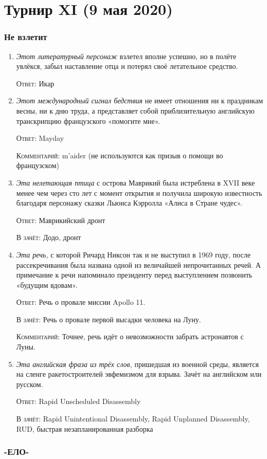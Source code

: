 \documentclass[a4paper,10pt]{article}
\let\keyword\textsc
\newenvironment{topic}{\begin{enumerate}}{\end{enumerate}}
\newcommand{\question}[3]{\item[#1.] #2 \par \keyword{Ответ:} #3}
\newcommand{\alternative}[1]{\par \keyword{В зачёт:} #1}
\newcommand{\commentary}[1]{\par \keyword{Комментарий:} #1}
\begin{document}
\newpage
\part{Турнир XI (9 мая 2020)}

\section{Не взлетит}

\begin{topic}
 \question{10}{\emph{Этот литературный персонаж} взлетел вполне успешно, но в полёте увлёкся, забыл наставление отца и потерял своё летательное средство.}{Икар}
 \question{20}{\emph{Этот международный сигнал бедствия} не имеет отношения ни к праздникам весны, ни к дню труда, а представляет собой приблизительную английскую транскрипцию французского  «помогите мне».}{Mayday}\commentary{m'aider (не используются как призыв о помощи во французском)}
 \question{30}{\emph{Эта нелетающая птица} с острова Маврикий была истреблена в XVII веке менее чем через сто лет с момент открытия и получила широкую известность благодаря персонажу сказки Льюиса Кэрролла «Алиса в Стране чудес».}{Маврикийский дронт}\alternative{Додо, дронт}
 \question{40}{\emph{Эта речь,} с которой Ричард Никсон так и не выступил в 1969 году, после рассекречивания была названа одной из величайшей непрочитанных речей. А примечание к речи напоминало президенту перед выступлением позвонить «будущим вдовам».}{Речь о провале миссии Apollo 11.}\alternative{Речь о провале первой высадки человека на Луну.}\commentary{Точнее, речь идёт о невозможности забрать астронавтов с Луны.}
 \question{50}{\emph{Эта английская фраза из трёх слов,} пришедшая из военной среды, является на сленге ракетостроителей эвфемизмом для взрыва. Зачёт на английском или русском.}{Rapid Unscheduled Disassembly}\alternative{Rapid Unintentional Disassembly, Rapid Unplanned Disassembly, RUD, быстрая незапланированная разборка}
\end{topic}


\section{-ЕЛО-}
\end{document}

